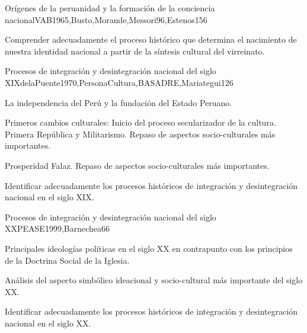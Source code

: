 \begin{syllabus}
\begin{unit}{Orígenes de la peruanidad y la formación de la conciencia nacional}{VAB1965,Busto,Morande,Messori96,Estenos}{15}{6}
\begin{topics}
\end{topics}
\begin{unitgoals}
	\item Comprender adecuadamente el proceso histórico que determina el nacimiento de nuestra identidad nacional a partir de la síntesis cultural del virreinato.
\end{unitgoals}
\end{unit}

\begin{unit}{Procesos de integración y desintegración nacional del siglo XIX}{delaPuente1970,PersonaCultura,BASADRE,Mariategui}{12}{6}
\begin{topics}
	\item La independencia del Perú y la fundación del Estado Peruano.
	\item Primeros cambios culturales: Inicio del proceso secularizador de la cultura. Primera República y Militarismo. Repaso de  aspectos socio-culturales más importantes.
	\item Prosperidad Falaz.  Repaso de  aspectos socio-culturales más importantes. 
\end{topics}
\begin{unitgoals}
	\item Identificar adecuadamente los procesos históricos de integración y desintegración nacional en el siglo XIX.
\end{unitgoals}
\end{unit}

\begin{unit}{Procesos de integración y desintegración nacional del siglo XX}{PEASE1999,Barnechea}{6}{6}
\begin{topics}
	\item Principales ideologías políticas en el siglo XX en contrapunto con los principios de la Doctrina Social de la Iglesia.
	\item Análisis del aspecto simbólico ideacional y socio-cultural más importante del siglo XX. 

\end{topics}
\begin{unitgoals}
	\item Identificar adecuadamente los procesos históricos de integración y desintegración nacional en el siglo XX. 
\end{unitgoals}
\end{unit}


\end{syllabus}
